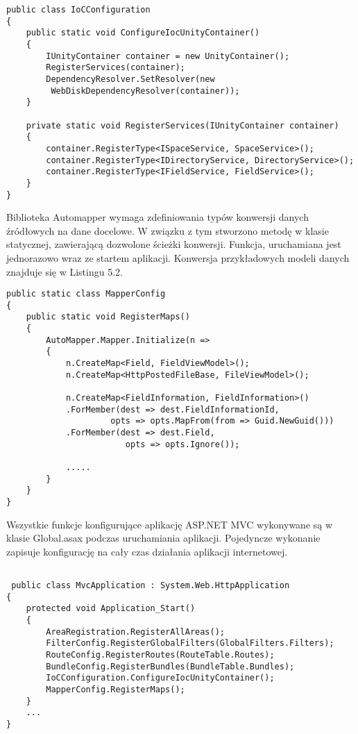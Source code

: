 \begin{lstlisting}[caption=Konfiguracja kontenera Odwrotnego sterowania ]
public class IoCConfiguration
{
	public static void ConfigureIocUnityContainer()
	{
		IUnityContainer container = new UnityContainer();
		RegisterServices(container);
		DependencyResolver.SetResolver(new
		 WebDiskDependencyResolver(container));
	}

	private static void RegisterServices(IUnityContainer container)
	{
		container.RegisterType<ISpaceService, SpaceService>();
		container.RegisterType<IDirectoryService, DirectoryService>();
		container.RegisterType<IFieldService, FieldService>();
	}
}
\end{lstlisting}

Biblioteka Automapper wymaga zdefiniowania typów konwersji danych źródłowych na dane docelowe. W związku z tym stworzono metodę w klasie statycznej, zawierającą dozwolone ścieżki konwersji. Funkcja, uruchamiana jest jednorazowo wraz ze startem aplikacji. Konwersja przykładowych modeli danych znajduje się w Listingu 5.2. 
\newpage

\begin{lstlisting}[caption=Konfiguracja biblioteki Automapper]
public static class MapperConfig
{
	public static void RegisterMaps()
	{
		AutoMapper.Mapper.Initialize(n =>
		{
			n.CreateMap<Field, FieldViewModel>();
			n.CreateMap<HttpPostedFileBase, FileViewModel>();
			
			n.CreateMap<FieldInformation, FieldInformation>()
			.ForMember(dest => dest.FieldInformationId,
					 opts => opts.MapFrom(from => Guid.NewGuid()))
			.ForMember(dest => dest.Field, 
						opts => opts.Ignore());
						
			.....
		}
	}
}

\end{lstlisting}

Wszystkie funkcje konfigurujące aplikację ASP.NET MVC wykonywane są w klasie Global.asax podczas uruchamiania aplikacji. Pojedyncze wykonanie zapisuje konfigurację na cały czas działania aplikacji internetowej. 


\begin{lstlisting}[caption=Konfiguracja aplikacji]

 public class MvcApplication : System.Web.HttpApplication
{
	protected void Application_Start()
	{
		AreaRegistration.RegisterAllAreas();
		FilterConfig.RegisterGlobalFilters(GlobalFilters.Filters);
		RouteConfig.RegisterRoutes(RouteTable.Routes);
		BundleConfig.RegisterBundles(BundleTable.Bundles);
		IoCConfiguration.ConfigureIocUnityContainer();
		MapperConfig.RegisterMaps();
	}
	...
}
\end{lstlisting}

